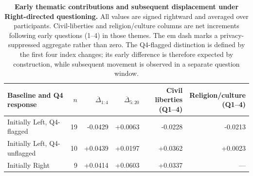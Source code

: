 \begin{table}[!t]
\centering
\caption{\textbf{Early thematic contributions and subsequent displacement under Right-directed questioning.} All values are signed rightward and averaged over participants. Civil-liberties and religion/culture columns are net increments following early questions (1--4) in those themes. The em dash marks a privacy-suppressed aggregate rather than zero. The Q4-flagged distinction is defined by the first four index changes; its early difference is therefore expected by construction, while subsequent movement is observed in a separate question window.}
\label{tab:nhb-theme-resistance}
\footnotesize
\setlength{\tabcolsep}{3pt}
\begin{tabularx}{\linewidth}{@{}Xrrrrr@{}}
\toprule
Baseline and Q4 response & $n$ & $\overline{\Delta}_{1:4}$ & $\overline{\Delta}_{5:20}$ & \shortstack{Civil liberties\\(Q1--4)} & \shortstack{Religion/culture\\(Q1--4)} \\
\midrule
Initially Left, Q4-flagged & 19 & -0.0429 & +0.0063 & -0.0228 & -0.0213 \\
Initially Left, Q4-unflagged & 10 & +0.0439 & +0.0197 & +0.0362 & +0.0023 \\
Initially Right & 9 & +0.0414 & +0.0603 & +0.0337 & --- \\
\bottomrule
\end{tabularx}
\end{table}
